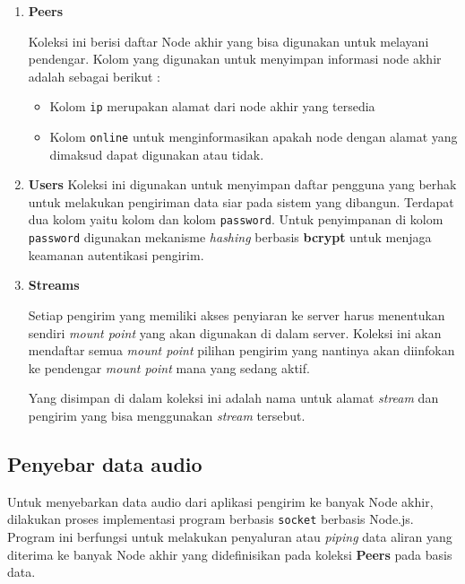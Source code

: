 \begin{enumerate}
    \item \textbf{Peers} 
    
    Koleksi ini berisi daftar Node akhir yang bisa digunakan untuk melayani pendengar. Kolom yang digunakan untuk menyimpan informasi node akhir adalah sebagai berikut :
    
    \begin{itemize}
    \item Kolom \texttt{ip} merupakan alamat dari node akhir yang tersedia
    \item Kolom \texttt{online} untuk menginformasikan apakah node dengan alamat yang dimaksud dapat digunakan atau tidak.
    \end{itemize}
    
    \item \textbf{Users}
    Koleksi ini digunakan untuk menyimpan daftar pengguna yang berhak untuk melakukan pengiriman data siar pada sistem yang dibangun. Terdapat dua kolom yaitu kolom  dan kolom \texttt{password}. Untuk penyimpanan di kolom \texttt{password} digunakan mekanisme \emph{hashing} berbasis \textbf{bcrypt} untuk menjaga keamanan autentikasi pengirim.
    
    \item \textbf{Streams}
    
    Setiap pengirim yang memiliki akses penyiaran ke server harus menentukan sendiri \textit{mount point} yang akan digunakan di dalam server. Koleksi ini akan mendaftar semua \textit{mount point} pilihan pengirim yang nantinya akan diinfokan ke pendengar \textit{mount point} mana yang sedang aktif. 
    
    Yang disimpan di dalam koleksi ini adalah nama  untuk alamat \textit{stream} dan pengirim yang bisa menggunakan \textit{stream} tersebut.
\end{enumerate}

\subsection{Penyebar data audio}

Untuk menyebarkan data audio dari aplikasi pengirim ke banyak Node akhir, dilakukan proses implementasi program berbasis \texttt{socket} berbasis Node.js. Program ini berfungsi untuk melakukan penyaluran atau \emph{piping} data aliran yang diterima ke banyak Node akhir yang didefinisikan pada koleksi \textbf{Peers} pada basis data. 

